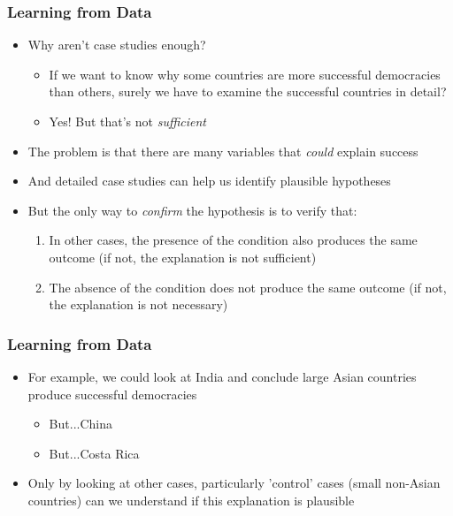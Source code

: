 \documentclass[xcolor=x11names,compress]{beamer}\usepackage[]{graphicx}\usepackage[]{color}
\renewcommand{\(}{\begin{columns}}
\renewcommand{\)}{\end{columns}}
\newcommand{\<}[1]{\begin{column}{#1}}
\renewcommand{\>}{\end{column}}
\begin{document}
\begin{frame}
\frametitle{Learning from Data}
\begin{itemize}
\item Why aren't case studies enough?
\pause
\begin{itemize}
\item If we want to know why some countries are more successful democracies than others, surely we have to examine the successful countries in detail?
\pause
\item Yes! But that's not \textit{sufficient}
\pause
\end{itemize}
\item The problem is that there are many variables that \textit{could} explain success
\pause
\item And detailed case studies can help us identify plausible hypotheses
\pause
\item But the only way to \textit{confirm} the hypothesis is to verify that:
\pause
\begin{enumerate}
\item In other cases, the presence of the condition also produces the same outcome (if not, the explanation is not sufficient)
\pause
\item The absence of the condition does not produce the same outcome (if not, the explanation is not necessary)
\end{enumerate}
\end{itemize}
\end{frame}

\begin{frame}
\frametitle{Learning from Data}
\begin{itemize}
\item For example, we could look at India and conclude large Asian countries produce successful democracies
\pause
\begin{itemize}
\item But...China
\pause
\item But...Costa Rica
\pause
\end{itemize}
\item Only by looking at other cases, particularly 'control' cases (small non-Asian countries) can we understand if this explanation is plausible
\end{itemize}
\end{frame}
\end{document}

